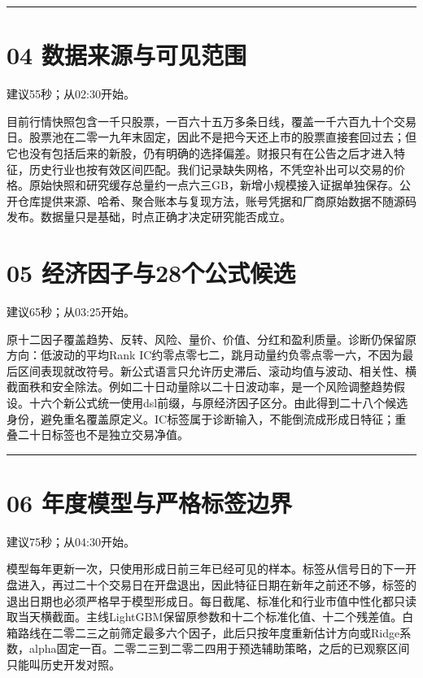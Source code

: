 \documentclass[UTF8,a4paper,12pt]{ctexart}
\begin{document}
\vspace{4mm}\noindent\textcolor{accent!40}{\rule{\textwidth}{0.4pt}}\par

\section*{\color{ink}04  数据来源与可见范围}

{\small\color{accent}建议55秒；从02:30开始。}\par

目前行情快照包含一千只股票，一百六十五万多条日线，覆盖一千六百九十个交易日。股票池在二零一九年末固定，因此不是把今天还上市的股票直接套回过去；但它也没有包括后来的新股，仍有明确的选择偏差。财报只有在公告之后才进入特征，历史行业也按有效区间匹配。我们记录缺失网格，不凭空补出可以交易的价格。原始快照和研究缓存总量约一点六三GB，新增小规模接入证据单独保存。公开仓库提供来源、哈希、聚合账本与复现方法，账号凭据和厂商原始数据不随源码发布。数据量只是基础，时点正确才决定研究能否成立。


\newpage

\section*{\color{ink}05  经济因子与28个公式候选}

{\small\color{accent}建议65秒；从03:25开始。}\par

原十二因子覆盖趋势、反转、风险、量价、价值、分红和盈利质量。诊断仍保留原方向：低波动的平均Rank IC约零点零七二，跳月动量约负零点零一六，不因为最后区间表现就改符号。新公式语言只允许历史滞后、滚动均值与波动、相关性、横截面秩和安全除法。例如二十日动量除以二十日波动率，是一个风险调整趋势假设。十六个新公式统一使用dsl前缀，与原经济因子区分。由此得到二十八个候选身份，避免重名覆盖原定义。IC标签属于诊断输入，不能倒流成形成日特征；重叠二十日标签也不是独立交易净值。


\vspace{4mm}\noindent\textcolor{accent!40}{\rule{\textwidth}{0.4pt}}\par

\section*{\color{ink}06  年度模型与严格标签边界}

{\small\color{accent}建议75秒；从04:30开始。}\par

模型每年更新一次，只使用形成日前三年已经可见的样本。标签从信号日的下一开盘进入，再过二十个交易日在开盘退出，因此特征日期在新年之前还不够，标签的退出日期也必须严格早于模型形成日。每日截尾、标准化和行业市值中性化都只读取当天横截面。主线LightGBM保留原参数和十二个标准化值、十二个残差值。白箱路线在二零二三之前筛定最多六个因子，此后只按年度重新估计方向或Ridge系数，alpha固定一百。二零二三到二零二四用于预选辅助策略，之后的已观察区间只能叫历史开发对照。
\end{document}

